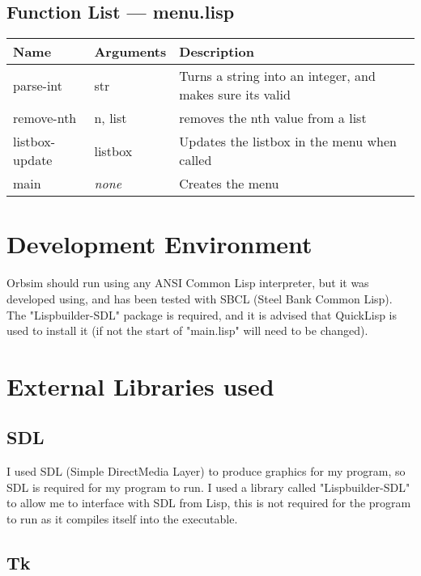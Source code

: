 \subsection{Function List --- menu.lisp}
\begin{tabular}{p{}p{}p{}}
	Name & Arguments & Description\\ \hline
	parse-int & str & Turns a string into an integer, and makes sure its
	valid \\
	remove-nth &n, list & removes the nth value from a list \\
	listbox-update & listbox & Updates the listbox in the menu when called
	\\
	main & \emph{none}  & Creates the menu \\
\end{tabular}

\section{Development Environment}
Orbsim should run using any ANSI Common Lisp interpreter, but it was developed
using, and has been tested with SBCL (Steel Bank Common Lisp). The
"Lispbuilder-SDL" package is required, and it is advised that QuickLisp is used
to install it (if not the start of "main.lisp" will need to be changed). 

\section{External Libraries used}
\subsection{SDL}
I used SDL (Simple DirectMedia Layer) to produce graphics for my program, so SDL
is required for my program to run. I used a library called "Lispbuilder-SDL" to
allow me to interface with SDL from Lisp, this is not required for the program
to run as it compiles itself into the executable.

\subsection{Tk}
